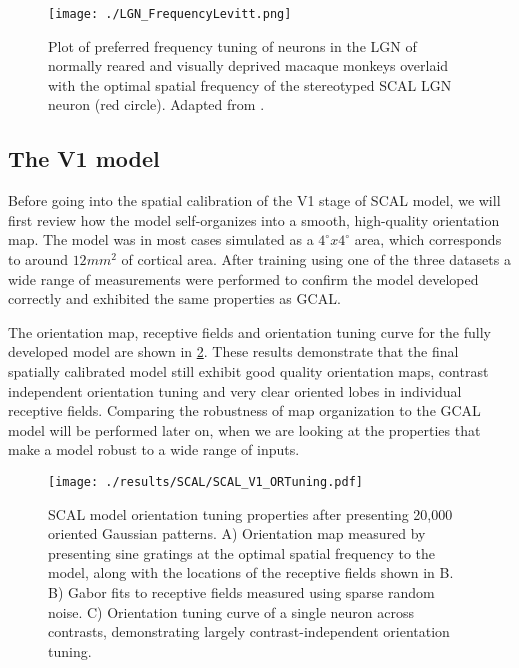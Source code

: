 \begin{figure}
	\centering
    \texttt{[image: ./LGN\_FrequencyLevitt.png]}
	\caption[Spatial frequency preference in SCAL compared to
      experiment. Adapted from \cite{Levitt2001}.]{Plot of preferred
      frequency tuning of neurons in the LGN of normally reared and
      visually deprived macaque monkeys overlaid with the optimal
      spatial frequency of the stereotyped SCAL LGN neuron (red
      circle). Adapted from \cite{Levitt2001}.}
	\label{LGNFrequencyLevitt}
\end{figure}

\subsection{The V1 model}

Before going into the spatial calibration of the V1 stage of SCAL
model, we will first review how the model self-organizes into a
smooth, high-quality orientation map. The model was in most cases
simulated as a $4^\circ x 4^\circ$ area, which corresponds to around
$12 mm^2$ of cortical area. After training using one of the three
datasets a wide range of measurements were performed to confirm the
model developed correctly and exhibited the same properties as GCAL.

The orientation map, receptive fields and orientation tuning curve for
the fully developed model are shown in \ref{SCALORTuning}. These
results demonstrate that the final spatially calibrated model still
exhibit good quality orientation maps, contrast independent
orientation tuning and very clear oriented lobes in individual
receptive fields. Comparing the robustness of map organization to the
GCAL model will be performed later on, when we are looking at the
properties that make a model robust to a wide range of inputs.

\begin{figure}
	\centering
    \texttt{[image: ./results/SCAL/SCAL\_V1\_ORTuning.pdf]}
	\caption[Orientation tuning properties of the SCAL model.]{SCAL
      model orientation tuning properties after presenting 20,000
      oriented Gaussian patterns. A) Orientation map measured by
      presenting sine gratings at the optimal spatial frequency to the
      model, along with the locations of the receptive fields shown in
      B. B) Gabor fits to receptive fields measured using sparse
      random noise. C) Orientation tuning curve of a single neuron
      across contrasts, demonstrating largely contrast-independent
      orientation tuning.}
	\label{SCALORTuning}
\end{figure}

